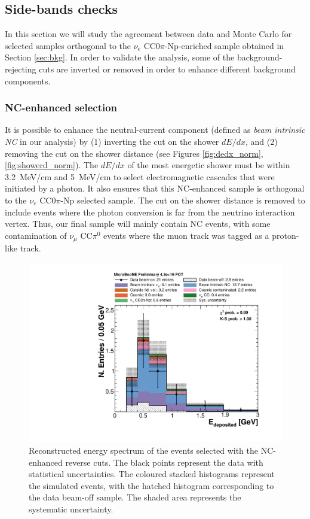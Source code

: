 \subsection{Side-bands checks}
In this section we will study the agreement between data and Monte Carlo for selected samples orthogonal to the $\nu_{e}$ CC0$\pi$-Np-enriched sample obtained in Section \ref{sec:bkg}. In order to validate the analysis, some of the background-rejecting cuts are inverted or removed in order to enhance different background components.
\subsubsection{NC-enhanced selection}
It is possible to enhance the neutral-current component (defined as \emph{beam intrinsic NC} in our analysis) by (1) inverting the cut on the shower $dE/dx$, and (2) removing the cut on the shower distance (see Figures \ref{fig:dedx_norm}, \ref{fig:showerd_norm}). The $dE/dx$ of the most energetic shower must be within 3.2~MeV/cm and 5~MeV/cm to select electromagnetic cascades that were initiated by a photon. It also ensures that this NC-enhanced sample is orthogonal to the $\nu_{e}$ CC0$\pi$-Np selected sample. The cut on the shower distance is removed to include events where the photon conversion is far from the neutrino interaction vertex.
Thus, our final sample will mainly contain NC events, with some contamination of $\nu_{\mu}$ CC$\pi^{0}$ events where the muon track was tagged as a proton-like track.

\begin{figure}[htbp]
\centering
  \includegraphics[width=0.7\linewidth]{figures/nc_reco.pdf}
  \caption{Reconstructed energy spectrum of the events selected with the NC-enhanced reverse cuts. The black points represent the data with statistical uncertainties. The coloured stacked histograms represent the simulated events, with the hatched histogram corresponding to the data beam-off sample. The shaded area represents the systematic uncertainty.}\label{fig:photon}
\end{figure}

